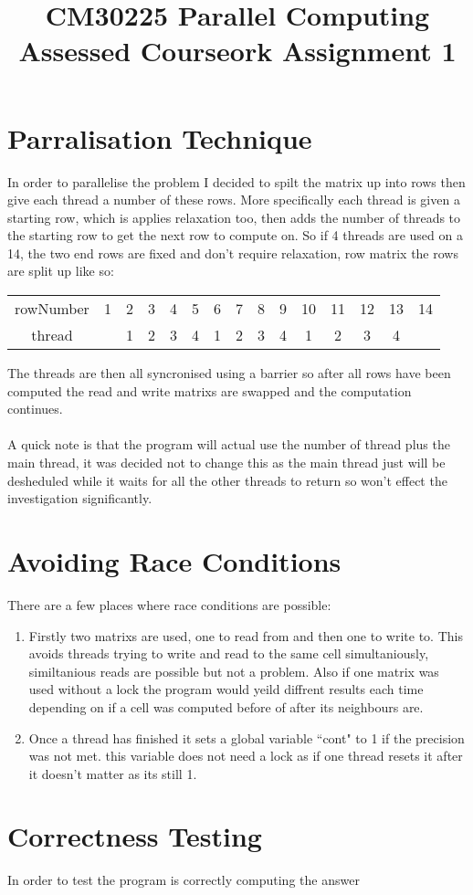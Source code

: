 \documentclass{article}
\begin{document}
\title{CM30225 Parallel Computing \\ Assessed Courseork Assignment 1}
\author{}

\maketitle

\section{Parralisation Technique}
In order to parallelise the problem I decided to spilt the matrix up into rows
then give each thread a number of these rows. More specifically each thread is
given a starting row, which is applies relaxation too, then adds the number of
threads to the starting row to get the next row to compute on. So if 4 threads
are used on a 14, the two end rows are fixed and don't require relaxation,
row matrix the rows are split up like so:

\begin{center}
\begin{tabular}{ |c|c|c|c|c|c|c|c|c|c|c|c|c|c|c| }
 \hline
 rowNumber & 1 & 2 & 3 & 4 & 5 & 6 & 7 & 8 & 9 & 10 & 11 & 12 & 13 & 14 \\
 thread &  & 1 & 2 & 3 & 4 & 1 & 2 & 3 & 4 & 1 & 2 & 3 & 4 &  \\
 \hline
\end{tabular}
\end{center}

The threads are then all syncronised using a barrier so after all rows have been
computed the read and write matrixs are swapped and the computation continues.\\~\\
A quick note is that the program will actual use the number of thread plus the
main thread, it was decided not to change this as the main thread just will be
desheduled while it waits for all the other threads to return so won't effect
the investigation significantly.

\section{Avoiding Race Conditions}
There are a few places where race conditions are possible:

\begin{enumerate}
\item Firstly two matrixs are used, one to read from and then one to write to.
This avoids threads trying to write and read to the same cell simultaniously,
similtanious reads are possible but not a problem. Also if one matrix was used without
a lock the program would yeild diffrent results each time depending on if a cell
was computed before of after its neighbours are.
\item Once a thread has finished it sets a global variable ``cont" to 1 if the
precision was not met. this variable does not need a lock as if one thread resets
it after it doesn't matter as its still 1.
\end{enumerate}

\section{Correctness Testing}
In order to test the program is correctly computing the answer 
\end{document}
